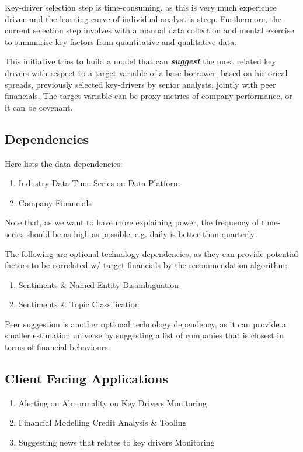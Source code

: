 \documentclass[]{article}
\begin{document}
Key-driver selection step is time-consuming, as this is very much experience 
driven and the learning curve of individual analyst is steep. Furthermore, the 
current selection step involves with a manual data collection and mental 
exercise to summarise key factors from quantitative and qualitative data. 

This initiative tries to build a model that can \textit{\textbf{suggest}} the 
most related key drivers with respect to a target variable of a base borrower, 
based on historical spreads, previously selected key-drivers by senior 
analysts, jointly with peer financials. The target variable can be proxy 
metrics of company performance, or it can be covenant. 

\subsection{Dependencies}
Here lists the data dependencies:
\begin{enumerate}
    \item Industry Data Time Series on Data Platform
    \item Company Financials
\end{enumerate}

Note that, as we want to have more explaining power, the frequency of 
time-series should be as high as possible, e.g. daily is better than quarterly.

The following are optional technology dependencies, as they can provide 
potential factors to be correlated w/ target financials by the recommendation 
algorithm:
\begin{enumerate}
    \item Sentiments \& Named Entity Disambiguation
    \item Sentiments \& Topic Classification
\end{enumerate}

Peer suggestion is another optional technology dependency, as it can provide a 
smaller estimation universe by suggesting a list of companies that is closest 
in terms of financial behaviours.

\subsection{Client Facing Applications}
\begin{enumerate}
    \item Alerting on Abnormality on Key Drivers \textrightarrow Monitoring
    \item Financial Modelling \textrightarrow Credit Analysis \& Tooling
    \item Suggesting news that relates to key drivers \textrightarrow Monitoring
\end{enumerate}
\end{document}
